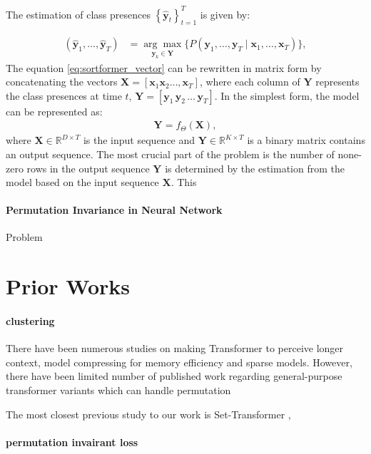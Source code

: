 \documentclass{article}
\begin{document}
The estimation of class presences $\left\{\hat{\mathbf{y}}_t\right\}_{t=1}^T$ is given by:

\begin{align}
  (\hat{\mathbf{y}}_1, \ldots, \hat{\mathbf{y}}_T) & = \underset{\mathbf{y}_k \in \mathbf{Y}}{\arg\max} \big\{ P\left(\mathbf{y}_1, \ldots, \mathbf{y}_T \mid \mathbf{x}_1, \ldots, \mathbf{x}_T\right) \big\},
  \label{eq:sortformer_vector}
\end{align}
The equation \ref{eq:sortformer_vector} can be rewritten in matrix form by concatenating the vectors $ \mathbf{X} = [ \mathbf{x}_1 \mathbf{x}_2 \ldots, \mathbf{x}_T ] $,
where each column of $\mathbf{Y}$ represents the class presences at time $t$, $ \mathbf{Y} = [\mathbf{y}_1 \, \mathbf{y}_2 \, \ldots \, \mathbf{y}_T]$.
In the simplest form, the model can be represented as:
\begin{align}
\mathbf{Y} = f_{\Theta}\left(\mathbf{X}\right),
\end{align}
where \( \mathbf{X} \in \mathbb{R}^{D \times T} \) is the input sequence and \( \mathbf{Y} \in \mathbb{R}^{K \times T} \) is a binary matrix contains an output sequence. 
The most crucial part of the problem is the number of none-zero rows in the output sequence \( \mathbf{Y} \) is determined by the estimation from the model based on the input sequence \( \mathbf{X} \).
This 

\paragraph{Permutation Invariance in Neural Network}
Problem

\section{Prior Works}

\paragraph{clustering}
There have been numerous studies on making Transformer to perceive longer context, model compressing for memory efficiency and sparse models. However, there have been limited number of published work regarding general-purpose transformer variants which can handle permutation

The most closest previous study to our work is Set-Transformer \cite{lee2019set},
\paragraph{permutation invairant loss}
\end{document}
